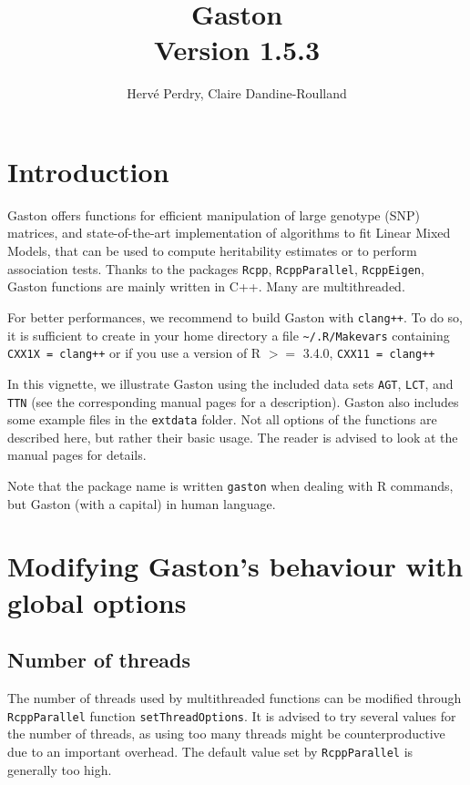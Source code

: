 \documentclass{article}\usepackage[]{graphicx}\usepackage[]{color}
\title{{\bfseries Gaston}\\
       {\large Version 1.5.3}}
\author{Hervé Perdry, Claire Dandine-Roulland}
\begin{document}
\maketitle

\section*{Introduction}

  Gaston offers functions for efficient manipulation of 
  large genotype (SNP) matrices, and state-of-the-art implementation of algorithms
  to fit Linear Mixed Models, that can be used to compute heritability 
  estimates or to perform association tests.
  Thanks to the packages \verb!Rcpp!, \verb!RcppParallel!, \verb!RcppEigen!, Gaston
  functions are mainly written in C++. Many are multithreaded.

  For better performances, we recommend to build Gaston with \verb!clang++!.
  To do so, it is sufficient to create in your home directory
  a file \verb!~/.R/Makevars! containing \verb!CXX1X = clang++! 
  or if you use a version of R $>=$ 3.4.0, \verb!CXX11 = clang++!

  In this vignette, we illustrate Gaston using the included data sets \verb!AGT!, \verb!LCT!,
  and \verb!TTN! (see the corresponding manual pages for a description). 
  Gaston also includes some example files in the \verb!extdata! folder. 
  Not all options of the functions are described here, but rather their basic usage.
  The reader is advised to look at the manual pages for details.

  Note that the package name is written \verb!gaston! when dealing with R commands, 
  but Gaston (with a capital) in human language.

\section{Modifying Gaston's behaviour with global options}

\subsection{Number of threads}

  The number of threads used by multithreaded functions can be modified 
  through \verb!RcppParallel!  function \verb!setThreadOptions!.
  It is advised to try several values for the number of threads, as 
  using too many threads might be counterproductive due to an important
  overhead. The default value set by \verb!RcppParallel! is generally
  too high.
\end{document}
